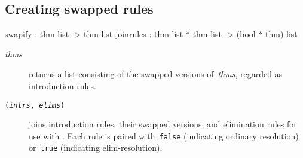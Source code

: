 \subsection{Creating swapped rules}
\begin{ttbox} 
swapify   : thm list -> thm list
joinrules : thm list * thm list -> (bool * thm) list
\end{ttbox}
\begin{description}
\item[ {\it thms}] returns a list consisting of the
swapped versions of~{\it thms}, regarded as introduction rules.

\item[ \tt({\it intrs}, {\it elims})]
joins introduction rules, their swapped versions, and elimination rules for
use with .  Each rule is paired with~{\tt false}
(indicating ordinary resolution) or~{\tt true} (indicating
elim-resolution).
\end{description}


